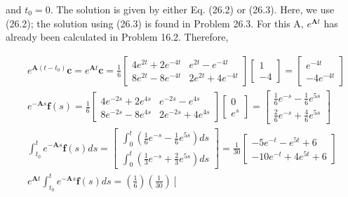 \documentclass[10pt]{article}
\begin{document}
and $t_{0}=0$. The solution is given by either Eq. (26.2) or (26.3). Here, we use (26.2); the solution using (26.3) is found in Problem 26.3. For this A, $e^{\mathbf{A} t}$ has already been calculated in Problem 16.2. Therefore,

$$
\begin{aligned}
& e^{\mathbf{A}\left(t-t_{0}\right)} \mathbf{c}=e^{\mathbf{A} t} \mathbf{c}=\frac{1}{6}\left[\begin{array}{cc}
4 e^{2 t}+2 e^{-4 t} & e^{2 t}-e^{-4 t} \\
8 e^{2 t}-8 e^{-4 t} & 2 e^{2 t}+4 e^{-4 t}
\end{array}\right]\left[\begin{array}{r}
1 \\
-4
\end{array}\right]=\left[\begin{array}{c}
e^{-4 t} \\
-4 e^{-4 t}
\end{array}\right] \\
& e^{-\mathbf{A} s} \mathbf{f}(s)=\frac{1}{6}\left[\begin{array}{cc}
4 e^{-2 s}+2 e^{4 s} & e^{-2 s}-e^{4 s} \\
8 e^{-2 s}-8 e^{4 s} & 2 e^{-2 s}+4 e^{4 s}
\end{array}\right]\left[\begin{array}{l}
0 \\
e^{s}
\end{array}\right]=\left[\begin{array}{l}
\frac{1}{6} e^{-s}-\frac{1}{6} e^{5 s} \\
\frac{2}{6} e^{-s}+\frac{4}{6} e^{5 s}
\end{array}\right] \\
& \int_{t_{0}}^{t} e^{-\mathbf{A} s} \mathbf{f}(s) d s=\left[\begin{array}{l}
\int_{0}^{t}\left(\frac{1}{6} e^{-s}-\frac{1}{6} e^{5 s}\right) d s \\
\int_{0}^{t}\left(\frac{1}{3} e^{-s}+\frac{2}{3} e^{5 s}\right) d s
\end{array}\right]=\frac{1}{30}\left[\begin{array}{c}
-5 e^{-t}-e^{5 t}+6 \\
-10 e^{-t}+4 e^{5 t}+6
\end{array}\right] \\
& e^{\mathbf{A} t} \int_{t_{0}}^{t} e^{-\mathbf{A} s} \mathbf{f}(s) d s=\left(\frac{1}{6}\right)\left(\frac{1}{30}\right)\left[\begin{array}{cc}

\end{array}
\end{aligned}$$
\end{document}
